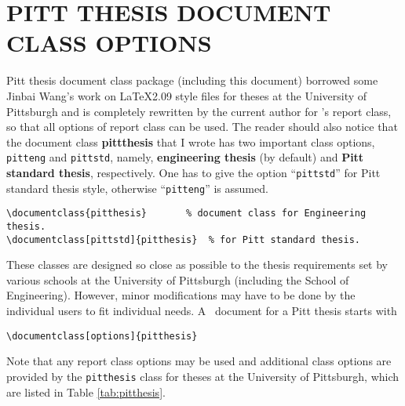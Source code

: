\chapter{PITT THESIS DOCUMENT CLASS OPTIONS}

Pitt thesis document class package (including this document) borrowed some
Jinbai Wang's work on \LaTeX 2.09 style files for theses at the University of
Pittsburgh\cite{jbw:tex} and is completely rewritten by the current author
for \LaTeXe 's report class, so that all options of report class can be used.
The reader should also notice that the document class \textbf{pittthesis} that
I wrote has two important class options, \texttt{pitteng} and \texttt{pittstd},
namely, \textbf{engineering thesis} (by default) and \textbf{Pitt standard
thesis}, respectively.	One has to give the option ``\texttt{pittstd}'' for
Pitt standard thesis style, otherwise ``\texttt{pitteng}'' is assumed.
\begin{verbatim}
\documentclass{pitthesis}	    % document class for Engineering thesis.
\documentclass[pittstd]{pitthesis}  % for Pitt standard thesis.
\end{verbatim}
These classes are designed so close as possible to the thesis requirements set
by various schools at the University of Pittsburgh (including the School of
Engineering)\cite{pitteng:thesis,pittstd:thesis}. However, minor modifications
may have to be done by the individual users to fit individual needs.
A \LaTeXe\ document for a Pitt thesis starts with
\begin{verbatim}
\documentclass[options]{pitthesis}
\end{verbatim}
Note that any report class options may be used and additional class options are
provided by the \texttt{pitthesis} class for theses at the University of
Pittsburgh, which are listed in Table \ref{tab:pitthesis}.
%

